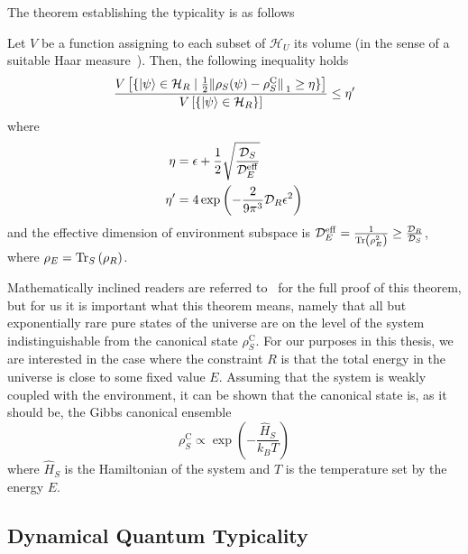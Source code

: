 The theorem establishing the typicality is as follows
\begin{theorem}
	Let \(V\) be a function assigning to each subset of \(\mathcal{H}_U\) its volume (in the sense of a suitable Haar measure~\autocite{VitaliD.Milman1986}).
	Then, the following inequality holds
	\begin{equation}
		\frac{V\left[\{\ket{\psi}\in\mathcal{H}_R \mid \frac{1}{2}\norm*{\rho_S(\psi) - \rho_S^{\mathrm{C}}}_1\geq \eta\}\right]}
		{V\left[\{\ket{\psi}\in \mathcal{H}_R\}\right]} \leq \eta^{\prime}
	\end{equation}
	where
	\begin{align*}
		\eta          & = \epsilon + \frac{1}{2}\sqrt{\frac{\mathcal{D}_S}{\mathcal{D}_E^{\mathrm{eff}}}} \\
		\eta^{\prime} & = 4 \exp\left(-\frac{2}{9\pi^3} \mathcal{D}_R \epsilon^2\right)
	\end{align*}
	and the effective dimension of environment subspace is \(\mathcal{D}_E^{\mathrm{eff}} =
	\frac{1}{\Tr\left(\rho_E^2\right)}\geq \frac{\mathcal{D}_R}{\mathcal{D}_S}\), where \(\rho_E = \Tr_S\left(\rho_R\right)\).
\end{theorem}
Mathematically inclined readers are
referred to~\textcite{Popescu2006a} for the full proof of this theorem, but for us it is important
what this theorem means, namely that all but exponentially rare pure states of the universe are on the level of the system
indistinguishable from the canonical state \(\rho_S^{\mathrm{C}}\).
For our purposes in this thesis, we are interested in the case where the constraint \(R\) is that the total energy
in the universe is close to some fixed value \(E\). Assuming that the system is weakly coupled with the environment, it
can be shown that the canonical state is, as it should be, the Gibbs canonical ensemble
\begin{equation}
	\rho_S^{\mathrm{C}} \propto \exp\left(-\frac{\hat{H} _S}{k_B T}\right)
\end{equation}
where \(\hat{H} _S\) is the Hamiltonian of the system and \(T\) is the temperature set by the energy \(E\).


\subsection{\label{sec:DQT} Dynamical Quantum Typicality}

